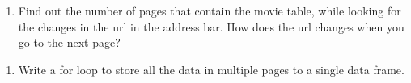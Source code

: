 \documentclass[
]{book}
\providecommand{\tightlist}{%
  \setlength{\itemsep}{0pt}\setlength{\parskip}{0pt}}
\begin{document}
\begin{enumerate}
\def\labelenumi{\arabic{enumi}.}
\setcounter{enumi}{1}
\tightlist
\item
  Find out the number of pages that contain the movie table, while looking for the changes in the url in the address bar. How does the url changes when you go to the next page?
\end{enumerate}

\begin{enumerate}
\def\labelenumi{\arabic{enumi}.}
\setcounter{enumi}{2}
\tightlist
\item
  Write a for loop to store all the data in multiple pages to a single data frame.
\end{enumerate}

  
\end{document}
